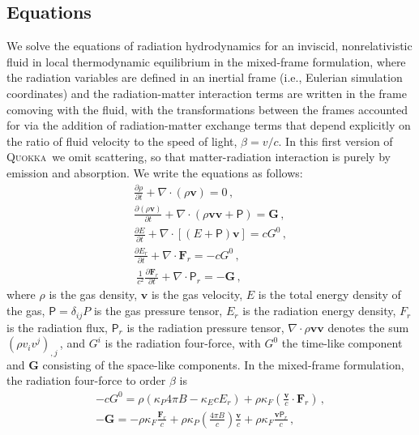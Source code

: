 \documentclass[fleqn,usenatbib]{mnras}
\newcommand{\vc}[1]{{\mathbf{#1}}}
\newcommand{\quokka}{\textsc{Quokka}}
\begin{document}
\subsection{Equations}
We solve the equations of radiation hydrodynamics \citep{Pomraning_1973,Mihalas_1984,Castor_2004} for an inviscid, nonrelativistic fluid in local thermodynamic equilibrium in the mixed-frame formulation, where the radiation variables are defined in an inertial frame (i.e., Eulerian simulation coordinates) and the radiation-matter interaction terms are written in the frame comoving with the fluid, with the transformations between the frames accounted for via the addition of radiation-matter exchange terms that depend explicitly on the ratio of fluid velocity to the speed of light, $\beta=v/c$. In this first version of \quokka~we omit scattering, so that matter-radiation interaction is purely by emission and absorption. We write the equations as follows:
\begin{align}
    \frac{\partial \rho}{\partial t} + \nabla \cdot (\rho \vc{v}) = 0 \, , \\
    \frac{\partial (\rho \vc{v})}{\partial t} + \nabla \cdot (\rho \vc{v} \vc{v} + \mathsf{P}) = \vc{G} \, , \\
    \frac{\partial E}{\partial t} + \nabla \cdot \left[(E + \mathsf{P})\vc{v}\right] = c G^0 \, , \\
    \frac{\partial E_r}{\partial t} + \nabla \cdot {\vc{F}_r} = -c G^0 \, , \\\
    \frac{1}{c^2}\frac{\partial \vc{F}_r}{\partial t} + \nabla \cdot \mathsf{P}_r = -\vc{G} \, ,
\end{align}
where $\rho$ is the gas density, $\vc{v}$ is the gas velocity, $E$ is the total energy density of the gas, $\mathsf{P} = \delta_{ij} P$ is the gas pressure tensor, $E_r$ is the radiation energy density, $F_r$ is the radiation flux, $\mathsf{P}_r$ is the radiation pressure tensor, $\nabla \cdot \rho \vc{v} \vc{v}$ denotes the sum $(\rho v_i v^j)_{,j}\,$, and $G^i$ is the radiation four-force, with $G^0$ the time-like component and $\vc{G}$ consisting of the space-like components. In the mixed-frame formulation, the radiation four-force to order $\beta$ is
\begin{align}
-c G^0 = \rho (\kappa_P 4 \pi B - \kappa_E c E_r) + \rho \kappa_F \left( \frac{\vc{v}}{c} \cdot \vc{F}_r \right) \, , \\
-\vc{G} = -\rho \kappa_F \frac{\vc{F}_r}{c} + \rho \kappa_P \left(\frac{4 \pi B}{c}\right) \frac{\vc{v}}{c} + \rho \kappa_F \frac{\vc{v}\mathsf{P}_r}{c} \, ,
\end{align}
\end{document}
